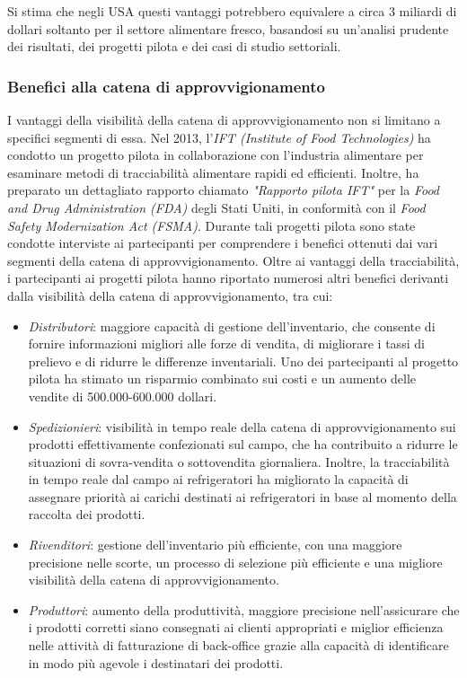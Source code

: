 Si stima che negli USA questi vantaggi potrebbero equivalere a circa 3 miliardi di dollari soltanto per il settore alimentare fresco, basandosi su un'analisi prudente dei risultati, dei progetti pilota e dei casi di studio settoriali.

\subsubsection{Benefici alla catena di approvvigionamento}

I vantaggi della visibilità della catena di approvvigionamento non si limitano a specifici segmenti di essa. Nel 2013, l'\textit{IFT (Institute of Food Technologies)} ha condotto un progetto pilota in collaborazione con l'industria alimentare per esaminare metodi di tracciabilità alimentare rapidi ed efficienti. Inoltre, ha preparato un dettagliato rapporto chiamato \textit{"Rapporto pilota IFT"} per la \textit{Food and Drug Administration (FDA)} degli Stati Uniti, in conformità con il \textit{Food Safety Modernization Act (FSMA)}. Durante tali progetti pilota sono state condotte interviste ai partecipanti per comprendere i benefici ottenuti dai vari segmenti della catena di approvvigionamento. Oltre ai vantaggi della tracciabilità, i partecipanti ai progetti pilota hanno riportato numerosi altri benefici derivanti dalla visibilità della catena di approvvigionamento, tra cui:

\begin{itemize}
    \item \textit{Distributori}: maggiore capacità di gestione dell'inventario, che consente di fornire informazioni migliori alle forze di vendita, di migliorare i tassi di prelievo e di ridurre le differenze inventariali. Uno dei partecipanti al progetto pilota ha stimato un risparmio combinato sui costi e un aumento delle vendite di 500.000-600.000 dollari.
    \item \textit{Spedizionieri}: visibilità in tempo reale della catena di approvvigionamento sui prodotti effettivamente confezionati sul campo, che ha contribuito a ridurre le situazioni di sovra-vendita o sottovendita giornaliera. Inoltre, la tracciabilità in tempo reale dal campo ai refrigeratori ha migliorato la capacità di assegnare priorità ai carichi destinati ai refrigeratori in base al momento della raccolta dei prodotti.
    \item \textit{Rivenditori}: gestione dell'inventario più efficiente, con una maggiore precisione nelle scorte, un processo di selezione più efficiente e una migliore visibilità della catena di approvvigionamento.
    \item \textit{Produttori}: aumento della produttività, maggiore precisione nell'assicurare che i prodotti corretti siano consegnati ai clienti appropriati e miglior efficienza nelle attività di fatturazione di back-office grazie alla capacità di identificare in modo più agevole i destinatari dei prodotti.
\end{itemize}

